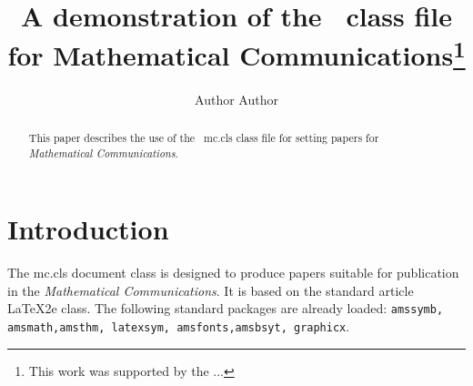 \documentclass{mc}
\begin{document}

\title[How to use the {\sf mc.cls} class file]{A demonstration of the \LaTeXe \ class file
                                              for  Mathematical Communications\thanks{This work was supported by the ...}}


\author[A. Author]{Author Author\corrauth}
\address{School of Applied Mathematics and Informatics, University of Osijek, Trg Ljudevita Gaja 6, HR-31 000 Osijek, Croatia}


%
%
%




\begin{abstract}
This paper describes the use of the \LaTeXe \ {\sf mc.cls} class
file for setting papers for  {\it Mathematical Communications}.
\end{abstract}



\maketitle

\section{Introduction}



The {\sf mc.cls}  document class is designed to produce papers suitable for publication in the {\em Mathematical Communications}.
It is based on the standard article \LaTeX2e class.
The following standard packages
are  already loaded:
{\tt amssymb, amsmath,amsthm, latexsym, amsfonts,amsbsyt, graphicx}.
\end{document}
